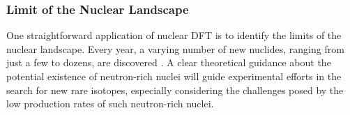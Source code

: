 \begin{comment}
Various EFT models are based on an effective interaction Lagragian, for example,
FSUGold model has the following effective Lagrangian \cite{PhysRevLett.95.122501}:
\begin{equation}
    \begin{aligned}
	\CL_{\text{int}} = &\bar{\psi} \left[ g_s\phi - \left( g_v V_\mu + \frac{g_\rho}{2}\vec{\tau}\odot\vec{b}_\mu + \frac{e}{2}(1 + \tau_3) A_\mu \right)\gamma^\mu \right]\psi \\
	    & - \frac{\kappa}{3!}(g_s\phi)^3 - \frac{\lambda}{4!}(g_s\phi)^4 + \frac{\zeta}{4!}(g_v^2 V_\mu V^\mu )^2	\\
	    & + \Lambda_v(g_\rho^2\vec{b}_\mu\vec{b}^\mu)(g_v^2 V_\mu V^\mu)
    \end{aligned}
\end{equation}
This Lagrangian density describes interactions of the nucleon field $\psi$ to
various meson fields and their self-interactions. $\phi$ is a scalar.

The difference between different EFT models is just how many coupling they
include in their effective Lagrangian density. With the Lagrangian density,
one can calculate the properties of various nuclei, fitting predicted values
to experimental results to get a parameter set for the coupling constant in
the Lagrangian, which is called one model. Frequently used EFT models include
NL3 \cite{}, FSUGold \cite{} and 
\end{comment}

\subsubsection{Limit of the Nuclear Landscape}

One straightforward application of nuclear DFT is to identify the limits of the nuclear
landscape. Every year, a varying number of new nuclides, ranging from just a few
to dozens, are discovered \cite{NEW_NULCIDES}. A clear theoretical guidance 
about the potential existence of neutron-rich nuclei will guide experimental 
efforts in the search for new rare isotopes, especially considering the challenges
posed by the low production rates of such neutron-rich nuclei.


